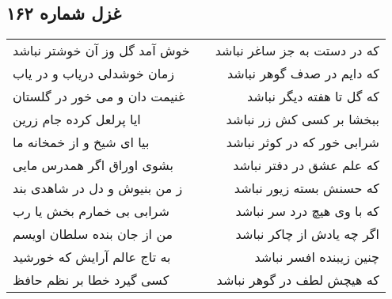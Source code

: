 \begin{center}
\section*{غزل شماره ۱۶۲}
\label{sec:sh162}
\begin{longtable}{l p{0.5cm} r}
خوش آمد گل وز آن خوشتر نباشد
&&
که در دستت به جز ساغر نباشد
\\
زمان خوشدلی دریاب و در یاب
&&
که دایم در صدف گوهر نباشد
\\
غنیمت دان و می خور در گلستان
&&
که گل تا هفته دیگر نباشد
\\
ایا پرلعل کرده جام زرین
&&
ببخشا بر کسی کش زر نباشد
\\
بیا ای شیخ و از خمخانه ما
&&
شرابی خور که در کوثر نباشد
\\
بشوی اوراق اگر همدرس مایی
&&
که علم عشق در دفتر نباشد
\\
ز من بنیوش و دل در شاهدی بند
&&
که حسنش بسته زیور نباشد
\\
شرابی بی خمارم بخش یا رب
&&
که با وی هیچ درد سر نباشد
\\
من از جان بنده سلطان اویسم
&&
اگر چه یادش از چاکر نباشد
\\
به تاج عالم آرایش که خورشید
&&
چنین زیبنده افسر نباشد
\\
کسی گیرد خطا بر نظم حافظ
&&
که هیچش لطف در گوهر نباشد
\\
\end{longtable}
\end{center}
